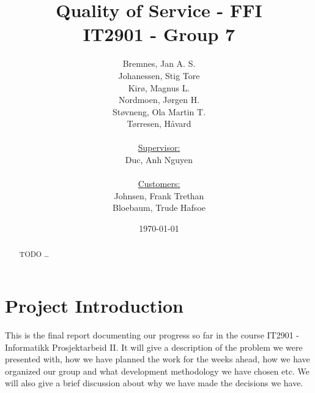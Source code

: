 \documentclass[titlepage, a4paper]{article}
\title{
    Quality of Service - FFI \\
    IT2901 - Group 7  \\ 
}
\author{
    Bremnes, Jan A. S.\\
    Johanessen, Stig Tore\\
    Kirø, Magnus L.\\
    Nordmoen, Jørgen H.\\
    Støvneng, Ola Martin T.\\
    Tørresen, Håvard\\
    \\
    \underline{Supervisor:}\\
    Duc, Anh Nguyen\\
    \\
    \underline{Customers:}\\
    Johnsen, Frank Trethan\\
    Bloebaum, Trude Hafsoe\\
}
\date{\today}
\begin{document}
\maketitle
\begin{abstract}\label{abstract}
	TODO \ldots
\end{abstract}
\newpage

\tableofcontents
\listoffigures
\listoftables


\section{Project Introduction}\label{Project Introduction}
    This is the final report documenting our progress so far in the course IT2901 - Informatikk Prosjektarbeid II. It will give a description of the problem we were presented with, how we have planned the work for the weeks ahead, how we have organized our group and what development methodology we have chosen etc. We will also give a brief discussion about why we have made the decisions we have. 











\appendix


\label{Glossary}
\printglossaries
%


\end{document}
